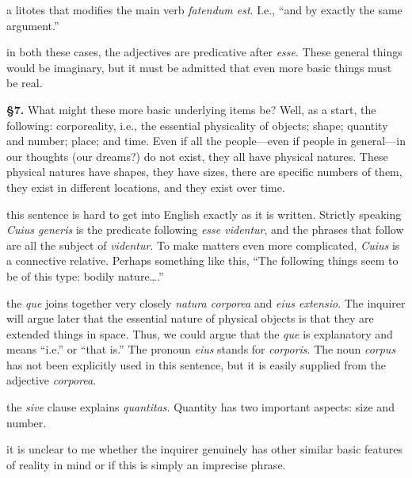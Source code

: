  a litotes that modifies the main verb \textit{fatendum est}. I.e., ``and by exactly the same argument.''

 in both these cases, the adjectives are predicative after \textit{esse}. These general things would be imaginary, but it must be admitted that even more basic things must be real.

\textbf{§7.} What might these more basic underlying items be? Well, as a start, the following: corporeality, i.e., the essential physicality of objects; shape; quantity and number; place; and time. Even if all the people---even if people in general---in our thoughts (our dreams?) do not exist, they all have physical natures. These physical natures have shapes, they have sizes, there are specific numbers of them, they exist in different locations, and they exist over time.

 this sentence is hard to get into English exactly as it is written. Strictly speaking \textit{Cuius generis} is the predicate following \textit{esse videntur}, and the phrases that follow are all the subject of \textit{videntur}. To make matters even more complicated, \textit{Cuius} is a connective relative. Perhaps something like this, ``The following things seem to be of this type: bodily nature\dots.''

 the \textit{que} joins together very closely \textit{natura corporea} and \textit{eius extensio}. The inquirer will argue later that the essential nature of physical objects is that they are extended things in space. Thus, we could argue that the \textit{que} is explanatory and means ``i.e.'' or ``that is.'' The pronoun \textit{eius} stands for \textit{corporis}. The noun \textit{corpus} has not been explicitly used in this sentence, but it is easily supplied from the adjective \textit{corporea}.

 the \textit{sive} clause explains \textit{quantitas}. Quantity has two important aspects: size and number.

 it is unclear to me whether the inquirer genuinely has other similar basic features of reality in mind or if this is simply an imprecise phrase.

\clearpage

